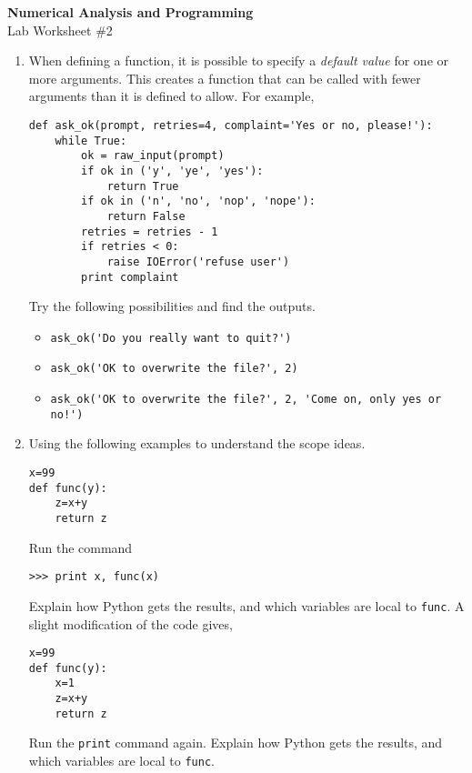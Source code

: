 \documentclass[12pt]{article}
\begin{document}
\begin{center}
\Large
\textbf{Numerical Analysis and Programming}\\
\large
Lab Worksheet \#2
\end{center}
\begin{enumerate}
\item When defining a function, it is possible to specify a \textit{default value} for one or more arguments. This creates a function that can be called with fewer arguments than it is defined to allow. For example,
\small
\begin{verbatim}
def ask_ok(prompt, retries=4, complaint='Yes or no, please!'): 
    while True:
        ok = raw_input(prompt) 
        if ok in ('y', 'ye', 'yes'):
            return True 
        if ok in ('n', 'no', 'nop', 'nope'):
            return False 
        retries = retries - 1 
        if retries < 0:
            raise IOError('refuse user') 
        print complaint
\end{verbatim}
\normalsize
Try the following possibilities and find the outputs.

\begin{itemize}\small
\item \verb!ask_ok('Do you really want to quit?')!
\item \verb!ask_ok('OK to overwrite the file?', 2)!
\item \verb"ask_ok('OK to overwrite the file?', 2, 'Come on, only yes or no!')"
\end{itemize}
\item Using the following examples to understand the scope ideas.
\begin{verbatim}
x=99
def func(y):
    z=x+y
    return z
\end{verbatim}
Run the command 
\begin{verbatim}
>>> print x, func(x)
\end{verbatim}
Explain how Python gets the results, and which variables are local to \verb"func". 
A slight modification of the code gives, 
\begin{verbatim}
x=99
def func(y):
    x=1
    z=x+y
    return z
\end{verbatim}
Run the \verb!print! command again. Explain how Python gets the results, and which variables are local to \verb"func".
\end{enumerate}
\end{document}
